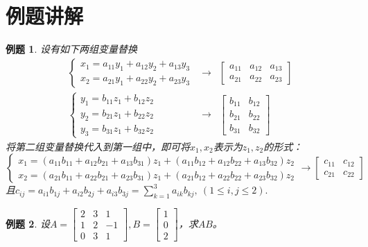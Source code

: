 \documentclass[a4paper]{book}
\newtheorem{eg}{例题}[chapter]
\begin{document}

\section{例题讲解}

\begin{eg}
设有如下两组变量替换
\begin{eqnarray*}
\begin{cases}
x_1 = a_{11}y_1 + a_{12}y_2 + a_{13}y_3 \\ x_2 = a_{21}y_1 + a_{22}y_2 + a_{23}y_3
\end{cases}
& \longrightarrow &
\begin{bmatrix}
a_{11} & a_{12} & a_{13} \\ a_{21} & a_{22} & a_{23}
\end{bmatrix} \\
\begin{cases}
y_1 = b_{11}z_1 + b_{12}z_2 \\ y_2 = b_{21}z_1 + b_{22}z_2 \\ y_3 = b_{31}z_1 + b_{32}z_2
\end{cases}
& \longrightarrow &
\begin{bmatrix}
b_{11} & b_{12} \\ b_{21} & b_{22} \\ b_{31} & b_{32}
\end{bmatrix}
\end{eqnarray*}
将第二组变量替换代入到第一组中，即可将$x_1, x_2$表示为$z_1, z_2$的形式：
$$
\begin{cases}
x_1 = (a_{11}b_{11} + a_{12}b_{21} + a_{13}b_{31})z_1 + (a_{11}b_{12} + a_{12}b_{22} + a_{13}b_{32})z_2 \\ x_2 = (a_{21}b_{11} + a_{22}b_{21} + a_{23}b_{31})z_1 + (a_{21}b_{12} + a_{22}b_{22} + a_{23}b_{32})z_2
\end{cases}
\longrightarrow
\begin{bmatrix}
c_{11} & c_{12} \\ c_{21} & c_{22}
\end{bmatrix}
$$
且$c_{ij} = a_{i1}b_{1j} + a_{i2}b_{2j} + a_{i3}b_{3j} = \sum\limits_{k=1}^3 a_{ik}b_{kj}, \ (1 \leqslant i,j \leqslant 2).$
\end{eg}

\begin{eg}
设$A = \begin{bmatrix} 2 & 3 & 1 \\ 1 & 2 & -1 \\ 0 & 3 & 1\end{bmatrix}, B = \begin{bmatrix} 1 \\ 0 \\ 2 \end{bmatrix}$，求$AB$。
\end{eg}
\end{document}
